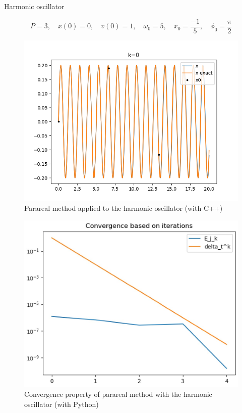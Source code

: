 \begin{frame}{Harmonic oscillator}
	
	$$P=3, \quad x(0)=0,\quad v(0)=1, \quad\omega_0=5, \quad x_0=\frac{-1}{5}, \quad \phi_0=\frac{\pi}{2}$$
	
	\begin{minipage}{0.45\linewidth}
		\begin{figure}
			\centering
			\includegraphics[width=\linewidth]{"images/parareal/osci_sol.png"}
			\caption{Parareal method applied to the harmonic oscillator (with C++)}
		\end{figure}
	\end{minipage} \; \qquad
	\begin{minipage}{0.45\linewidth}
		\begin{figure}
			\centering
			\includegraphics[width=\linewidth]{"images/parareal/osci_cvg_1.jpg"}
			\caption{Convergence property of parareal method with the harmonic oscillator (with Python)}
		\end{figure}
	\end{minipage}
	
\end{frame}






